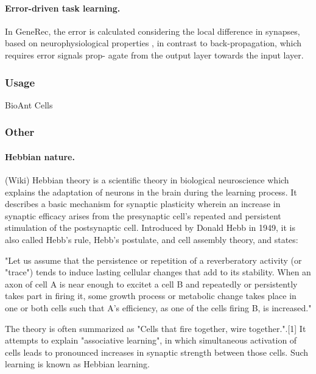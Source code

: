\paragraph{Error-driven task learning.} In GeneRec, the error is
calculated considering the local difference in synapses,
based on neurophysiological properties \citet{o1998six}, in contrast
to back-propagation, which requires error signals prop-
agate from the output layer towards the input layer.

\subsubsection{Usage} 

BioAnt \citet{schneider2009application} 
Cells \citet{nawrocki2012monitoring} 


\subsubsection{Other} 
\paragraph{Hebbian nature.}

(Wiki) Hebbian theory is a scientific theory in biological neuroscience which explains the adaptation of neurons in the brain during the learning process. It describes a basic mechanism for synaptic plasticity wherein an increase in synaptic efficacy arises from the presynaptic cell's repeated and persistent stimulation of the postsynaptic cell. Introduced by Donald Hebb in 1949, it is also called Hebb's rule, Hebb's postulate, and cell assembly theory, and states:

    "Let us assume that the persistence or repetition of a reverberatory activity (or "trace") tends to induce lasting cellular changes that add to its stability. When an axon of cell A is near enough to excitet a cell B and repeatedly or persistently takes part in firing it, some growth process or metabolic change takes place in one or both cells such that A's efficiency, as one of the cells firing B, is increased."

The theory is often summarized as "Cells that fire together, wire together.".[1] It attempts to explain "associative learning", in which simultaneous activation of cells leads to pronounced increases in synaptic strength between those cells. Such learning is known as Hebbian learning.

